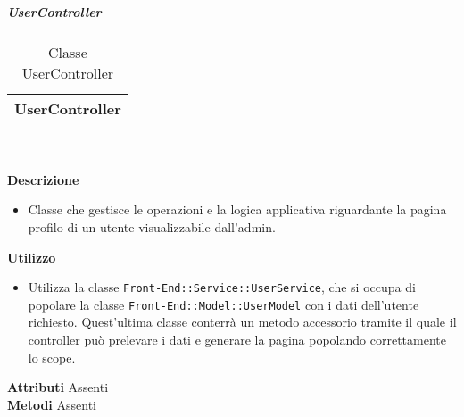 			\subparagraph{UserController} 
\begin{table}[ht]
\begin{center}
\bgroup
	\setlength{\arrayrulewidth}{0.6mm}
	\def\arraystretch{1}
		\begin{tabular}{ | p{12cm} | }
				\hline  
					\centerline{\textbf{UserController}}
		\\ \hline 
				\hline
				\hline
		
		\end{tabular}
\egroup
\caption{Classe UserController}
\end{center}
\end{table} \textbf{\\ \\ Descrizione}
\begin{itemize}
\item[] Classe che gestisce le operazioni e la logica applicativa riguardante la pagina profilo di un utente visualizzabile dall'admin.
\end{itemize} 
\textbf{Utilizzo}
\begin{itemize}
\item[] Utilizza la classe \texttt{Front-End::Service::UserService}, che si occupa di popolare la classe \texttt{Front-End::Model::UserModel} con i dati dell'utente richiesto. Quest'ultima classe conterrà un metodo accessorio tramite il quale il controller può prelevare i dati e generare la pagina popolando correttamente lo scope.
\end{itemize}
\textbf{Attributi}
Assenti \\
\textbf{Metodi}
Assenti \\

